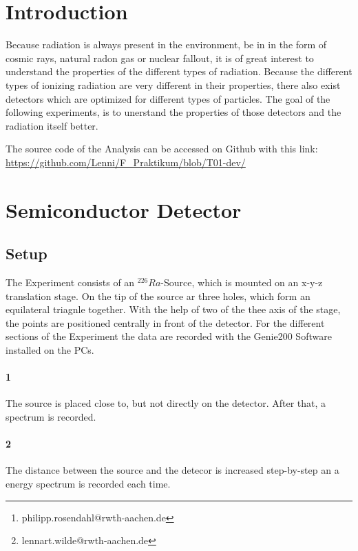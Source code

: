 \documentclass[12pt,twoside,a4paper]{scrartcl}
\author{Philipp Rosendahl Mat.-Nr: 378029\thanks{philipp.rosendahl@rwth-aachen.de}
		\and Lennart Wilde, Mat.-Nr: 381588\thanks{lennart.wilde@rwth-aachen.de}}
\begin{document}
\maketitle
\newpage

\tableofcontents
\newpage


\section{Introduction}

	Because radiation is always present in the environment, be in in the form of cosmic rays, natural radon gas or nuclear fallout, it is of great interest to understand the properties of the different types of radiation.
	Because the different types of ionizing radiation are very different in their properties, there also exist detectors which are optimized for different types of particles. The goal of the following experiments, is to unerstand the properties of those detectors and the radiation itself better.

	The source code of the Analysis can be accessed on Github with this link: \url{https://github.com/Lenni/F_Praktikum/blob/T01-dev/}

\section{Semiconductor Detector}

	\subsection{Setup}

		The Experiment consists of an $ ^{226}Ra$-Source, which is mounted on an x-y-z translation stage. On the tip of the source ar three holes, which form an equilateral triagnle together. With the help of two of the thee axis of the stage, the points are positioned centrally in front of the detector. For the different sections of the Experiment the data are recorded with the Genie200 Software installed on the PCs.

		\paragraph{1}
			The source is placed close to, but not directly on the detector. After that, a spectrum is recorded.

		\paragraph{2}
			The distance between the source and the detecor is increased step-by-step an a energy spectrum is recorded each time.
\end{document}
